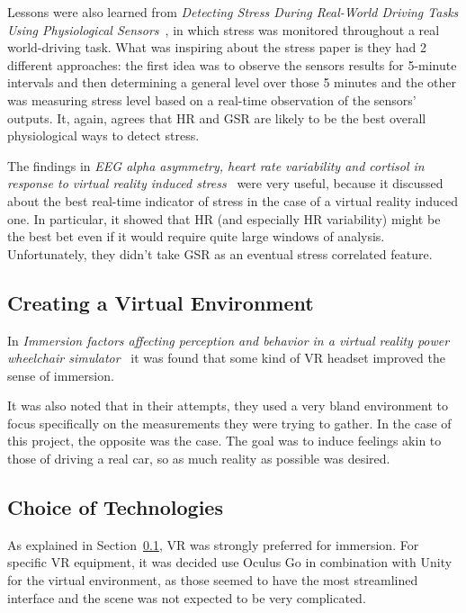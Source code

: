 Lessons were also learned from \textit{Detecting Stress During Real-World
Driving Tasks Using Physiological Sensors}~\cite{detecting_stress}, in which
stress was monitored throughout a real world-driving task. What was inspiring
about the stress paper is they had 2 different approaches: the first idea was
to observe the sensors results for 5-minute intervals and then determining
a general level over those 5 minutes and the other was measuring stress
level based on a real-time observation of the sensors' outputs. It, again,
agrees that HR and GSR are likely to be the best overall physiological ways
to detect stress.

The findings in \textit{EEG alpha asymmetry, heart rate variability and
cortisol in response to virtual reality induced stress}~\cite{eeg_alpha}
were very useful, because it discussed about the best real-time indicator
of stress in the case of a virtual reality induced one. In particular,
it showed that HR (and especially HR variability) might be the best bet
even if it would require quite large windows of analysis. Unfortunately,
they didn't take GSR as an eventual stress correlated feature.

\subsection{Creating a Virtual Environment}\label{sec:research_vr}

In \textit{Immersion factors affecting perception and behavior in a virtual
reality power wheelchair simulator}~\cite{immersion_factors} it was found that
some kind of VR headset improved the sense of immersion. 

It was also noted that in their attempts, they used a very bland environment
to focus specifically on the measurements they were trying to gather. In the
case of this project, the opposite was the case. The goal was to induce
feelings akin to those of driving a real car, so as much reality as possible
was desired.

\subsection{Choice of Technologies}\label{sec:choice_of_technologies}

As explained in Section~\ref{sec:research_vr}, VR was strongly preferred
for immersion. For specific VR equipment, it was decided use Oculus Go
in combination with Unity for the virtual environment, as those seemed to
have the most streamlined interface and the scene was not expected to be
very complicated.

